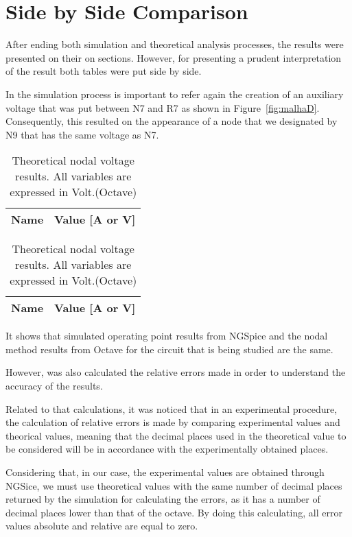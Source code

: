 \section{Side by Side Comparison}
\label{sec:comparison}


After ending both simulation and theoretical analysis processes, the results were presented on their on sections. However, for presenting a prudent interpretation of the result both tables were put side by side.

In the simulation process is important to refer again the creation of an auxiliary voltage that was put between N7 and R7 as shown in Figure~\ref{fig:malhaD}. Consequently, this resulted on the appearance of a node that we designated by N9 that has the same voltage as N7.

\begin{table}[ht]
\parbox{.45\linewidth}{
  \centering
  \begin{tabular}{|l|r|}
    \hline    
    {\bf Name} & {\bf Value [A or V]} \\ \hline
    
  \end{tabular}
  \caption{Simulation nodal voltage results. All variables are expressed in Volt or Ampere. (Ngspice)}} 
\parbox{.45\linewidth}{
  \centering
  \begin{tabular}{|l|r|}
    \hline    
    {\bf Name} & {\bf Value [A or V]} \\ \hline
    
  \end{tabular}
  \caption{Theoretical nodal voltage results. All variables are expressed in Volt.(Octave)}}
 
\end{table}

It shows that simulated operating point results from NGSpice and the nodal method results from Octave for the circuit that is being studied are the same.

However, was also calculated the relative errors made in order to understand the accuracy of the results. 

Related to that calculations, it was noticed that in an experimental procedure, the calculation of relative errors is made by comparing experimental values and theorical values, meaning that the decimal places used in the theoretical value to be considered will be in accordance with the experimentally obtained places.

Considering that, in our case, the experimental values are obtained through NGSice, we must use theoretical values with the same number of decimal places returned by the simulation for calculating the errors, as it has a number of decimal places lower than that of the octave. By doing this calculating, all error values absolute and relative are equal to zero. 

